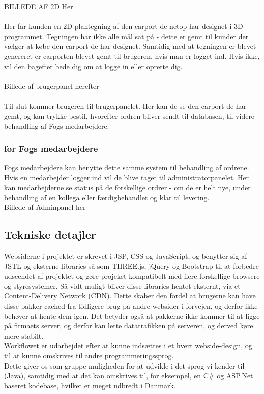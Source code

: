 BILLEDE AF 2D Her
\\\\
Her får kunden en 2D-plantegning af den carport de netop har designet i 3D-programmet. Tegningen har ikke alle mål sat på - dette er gemt til kunder der vælger at købe den carport de har designet. Samtidig med at tegningen er blevet genereret er carporten blevet gemt til brugeren, hvis man er logget ind. Hvis ikke, vil den bagefter bede dig om at logge in eller oprette dig.
\\\\
Billede af brugerpanel herefter
\\\\
Til slut kommer brugeren til brugerpanelet. Her kan de se den carport de har gemt, og kan trykke bestil, hvorefter ordren bliver sendt til databasen, til videre behandling af Fogs medarbejdere.
\subsubsection{for Fogs medarbejdere}
Fogs medarbejdere kan benytte dette samme system til behandling af ordrene. Hvis en medarbejder logger ind vil de blive taget til administratorpanelet. Her kan medarbejderne se status på de forskellige ordrer - om de er helt nye, under behandling af en kollega eller færdigbehandlet og klar til levering.
\\
Billede af Adminpanel her
\\

\subsection{Tekniske detajler}
Websiderne i projektet er skrevet i JSP, CSS og JavaScript, og benytter sig af JSTL og eksterne libraries så som THREE.js, jQuery og Bootstrap til at forbedre udseendet af projektet og gøre projeket kompatibelt med flere forskellige browsere og styresystemer. Så vidt muligt bliver disse libraries hentet eksternt, via et Content-Delivery Network (CDN). Dette skaber den fordel at brugerne kan have disse pakker cached fra tidligere brug på andre websider i forvejen, og derfor ikke behøver at hente dem igen. Det betyder også at pakkerne ikke kommer til at ligge på firmaets server, og derfor kan lette datatrafikken på serveren, og derved køre mere stabilt.\\
Workflowet er udarbejdet efter at kunne indsættes i et hvert webside-design, og til at kunne omskrives til andre programmeringssprog.\\
Dette giver os som gruppe muligheden for at udvikle i det sprog vi kender til (Java), samtidig med at det kan omskrives til, for eksempel, en C\# og ASP.Net baseret kodebase, hvilket er meget udbredt i Danmark.